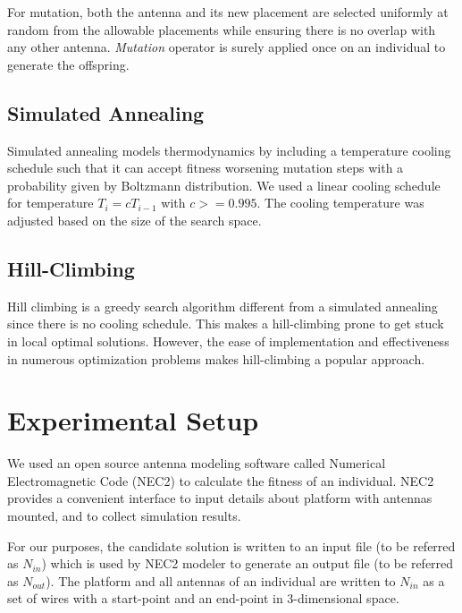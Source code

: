 \documentclass[conference]{IEEEtran}
\begin{document}
For mutation, both the antenna and its new placement are selected uniformly at random from the allowable placements while ensuring there is no overlap with any other antenna. \textit{Mutation} operator is surely applied once on an individual to generate the offspring.
\subsection{Simulated Annealing}
\label{sec:algoriths-sa}
Simulated annealing models thermodynamics by including a temperature cooling schedule such that it can accept fitness worsening mutation steps with a probability given by Boltzmann distribution. We used a linear cooling schedule for temperature $T_i = c T_{i-1}$ with $c >= 0.995$. The cooling temperature was adjusted based on the size of the search space.
\subsection{Hill-Climbing}
\label{sec:algoriths-hc}
Hill climbing is a greedy search algorithm different from a simulated annealing since there is no cooling schedule. This makes a hill-climbing prone to get stuck in local optimal solutions. However, the ease of implementation and effectiveness in numerous optimization problems makes hill-climbing a popular approach.

\section{Experimental Setup}
\label{sec:setup}
We used an open source antenna modeling software called Numerical Electromagnetic Code (NEC2) to calculate the fitness of an individual. NEC2 provides a convenient interface to input details about platform with antennas mounted, and to collect simulation results.

For our purposes, the candidate solution is written to an input file (to be referred as $N_{in}$) which is used by NEC2 modeler to generate an output file (to be referred as $N_{out}$). The platform and all antennas of an individual are written to $N_{in}$ as a set of wires with a start-point and an end-point in 3-dimensional space.  
\end{document}
